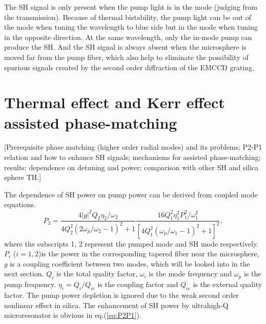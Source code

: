 \documentclass[a4paper,8pt,hyperref, twocolumn]{article}
\begin{document}
The SH signal is only present when the pump light is in the mode (judging from the transmission). Because of thermal bistability\cite{carmon2004dynamical}, the pump light can be out of the mode when tuning the wavelength to blue side but in the mode when tuning in the opposite direction. At the same wavelength, only the in-mode pump can produce the SH. And the SH signal is always absent when the microsphere is moved far from the pump fiber, which also help to eliminate the possibility of spurious signals created by the second order diffraction of the EMCCD grating.

\section{Thermal effect and Kerr effect assisted phase-matching}
[Prerequisite phase matching (higher order radial modes) and its problems; P2-P1 relation and how to enhance SH signals; mechanisms for assisted phase-matching; results: dependence on detuning and power; comparison with other SH and silica sphere TH.]

The dependence of SH power on pump power can be derived from coupled mode equations\cite{haus1991coupled}.
\begin{equation}
P_2 = \frac{4|g|^2Q_2\eta_2/\omega_2}{4Q_2^2(2\omega_p/\omega_2-1)^2+1}\frac{16Q_1^2\eta_1^2P_1^2/\omega_1^2}{[4Q_1^2(\omega_p/\omega_1-1)^2+1]^2},
\label{eq:P2P1}
\end{equation}
where the subscripts 1, 2 represent the pumped mode and SH mode respectively. $P_i$ ($i=1, 2$)is the power in the corresponding tapered fiber near the microsphere, $g$ is a coupling coefficient between two modes, which will be looked into in the next section. $Q_i$ is the total quality factor, $\omega_i$ is the mode frequency and $\omega_p$ is the pump frequency. $\eta_{i}=Q_i/Q_{ie}$ is the coupling factor and $Q_{ie}$ is the external quality factor. The pump power depletion is ignored due to the weak second order nonlinear effect in silica. The enhancement of SH power by ultrahigh-Q microresonator is obvious in eq.(\ref{eq:P2P1}). 
\end{document}

